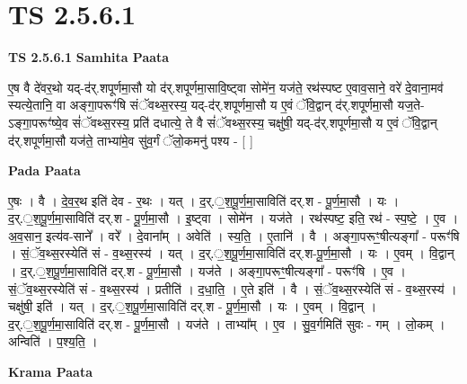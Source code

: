 \documentclass[17pt]{extarticle}
\begin{document}
\section{ TS 2.5.6.1 }

\textbf{TS 2.5.6.1 } \newline
\textbf{Samhita Paata} \newline

ए॒ष वै दे॑वर॒थो यद्-द॑र्.शपूर्णमा॒सौ यो द॑र्.शपूर्णमा॒सावि॒ष्ट्वा सोमे॑न॒ यज॑ते॒ रथ॑स्पष्ट ए॒वाव॒साने॒ वरे॑ दे॒वाना॒मव॑ स्यत्ये॒तानि॒ वा अङ्गा॒परूꣳ॑षि संॅवथ्स॒रस्य॒ यद्-द॑र्.शपूर्णमा॒सौ य ए॒वं ॅवि॒द्वान् द॑र्.शपूर्णमा॒सौ यज॒ते-ऽङ्गा॒परूꣳ॑ष्ये॒व सं॑ॅवथ्स॒रस्य॒ प्रति॑ दधात्ये॒ ते वै सं॑ॅवथ्स॒रस्य॒ चक्षु॑षी॒ यद्-द॑र्.शपूर्णमा॒सौ य ए॒वं ॅवि॒द्वान् द॑र्.शपूर्णमा॒सौ यज॑ते॒ ताभ्या॑मे॒व सु॑व॒र्गं ॅलो॒कमनु॑ पश्य - [  ] \newline

\textbf{Pada Paata} \newline

ए॒षः । वै । दे॒व॒र॒थ इति॑ देव - र॒थः । यत् । द॒र्.॒श॒पू॒र्ण॒मा॒साविति॑ दर्.श - पू॒र्ण॒मा॒सौ । यः । द॒र्.॒श॒पू॒र्ण॒मा॒साविति॑ दर्.श - पू॒र्ण॒मा॒सौ । इ॒ष्ट्वा । सोमे॑न । यज॑ते । रथ॑स्पष्ट॒ इति॒ रथ॑ - स्प॒ष्टे॒ । ए॒व । अ॒व॒सान॒ इत्य॑व-साने᳚ । वरे᳚ । दे॒वाना᳚म् । अवेति॑ । स्य॒ति॒ । ए॒तानि॑ । वै । अङ्गा॒परूꣳ॒॒षीत्यङ्गा᳚ - परूꣳ॑षि । सं॒ॅव॒थ्स॒रस्येति॑ सं - व॒थ्स॒रस्य॑ । यत् । द॒र्.॒श॒पू॒र्ण॒मा॒साविति॑ दर्.श-पू॒र्ण॒मा॒सौ । यः । ए॒वम् । वि॒द्वान् । द॒र्.॒श॒पू॒र्ण॒मा॒साविति॑ दर्.श - पू॒र्ण॒मा॒सौ । यज॑ते । अङ्गा॒परूꣳ॒॒षीत्यङ्गा᳚ - परूꣳ॑षि । ए॒व । सं॒ॅव॒थ्स॒रस्येति॑ सं - व॒थ्स॒रस्य॑ । प्रतीति॑ । द॒धा॒ति॒ । ए॒ते इति॑ । वै । सं॒ॅव॒थ्स॒रस्येति॑ सं - व॒थ्स॒रस्य॑ । चक्षु॑षी॒ इति॑ । यत् । द॒र्.॒श॒पू॒र्ण॒मा॒साविति॑ दर्.श - पू॒र्ण॒मा॒सौ । यः । ए॒वम् । वि॒द्वान् । द॒र्.॒श॒पू॒र्ण॒मा॒साविति॑ दर्.श - पू॒र्ण॒मा॒सौ । यज॑ते । ताभ्या᳚म् । ए॒व । सु॒व॒र्गमिति॑ सुवः - गम् । लो॒कम् । अन्विति॑ । प॒श्य॒ति॒ ।  \newline


\textbf{Krama Paata} \newline
\end{document}

